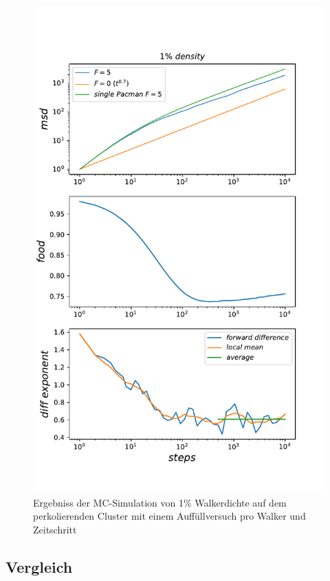 \documentclass[a4paper, 12pt]{report}
\begin{document}
\begin{figure}[H]
	\centering
	\includegraphics[scale=0.75]{1percent_new_food1.pdf}
	\caption{Ergebniss der MC-Simulation von 1\% Walkerdichte auf dem perkolierenden Cluster mit einem Auffüllversuch pro Walker und Zeitschritt}
\end{figure}

\clearpage

\subsection{Vergleich}
\end{document}
